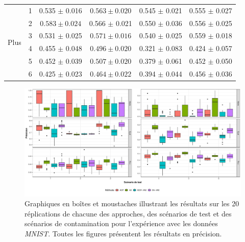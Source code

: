 \begin{table}[h]
\begin{tabular}{|c|c|c c c c|}
		\multirow{6}{*}{Plus} 
		& 1 & 0.535 $\pm$ 0.016 & $0.563 \pm 0.020$ & 0.545 $\pm$ 0.021 & 0.555 $\pm$ 0.027  \\
		& 2 & $0.583 \pm 0.024$ & 0.566 $\pm$ 0.021 & 0.550 $\pm$ 0.036 & 0.556 $\pm$ 0.025  \\
		& 3 & 0.531 $\pm$ 0.025 & $\mathbf{0.571 \pm 0.016}$ & 0.540 $\pm$ 0.025 & 0.559 $\pm$ 0.018  \\
		& 4 & 0.455 $\pm$ 0.048 & $\mathbf{0.496 \pm 0.020}$ & 0.321 $\pm$ 0.083 & 0.424 $\pm$ 0.057  \\			
		& 5 & 0.452 $\pm$ 0.039 & $\mathbf{0.507 \pm 0.020}$ & 0.379 $\pm$ 0.061 & 0.452 $\pm$ 0.050  \\
		& 6 & 0.425 $\pm$ 0.023 & $0.464 \pm 0.022$ & 0.394 $\pm$ 0.044 & 0.456 $\pm$ 0.036  \\
		\midrule
	\end{tabular} 
	\label{tab:precision_mnist}
\end{table}

\begin{figure}[H]
	\centering
	\includegraphics[width=\linewidth]{images/images_boxplots/precision_mnist.pdf}
	\DIFdelbeginFL %
\DIFdelendFL \DIFaddbeginFL \caption[Graphiques en boîtes et moustaches illustrant les résultats de précision pour les données \textit{MNIST}.]{\DIFaddendFL Graphiques en boîtes et moustaches illustrant les résultats sur les 20 réplications de chacune des approches, des scénarios de test et des scénarios de contamination pour l'expérience avec les données \textit{MNIST}. Toutes les figures présentent les résultats en précision.}
	\label{fig:precision_mnist}
\end{figure}

